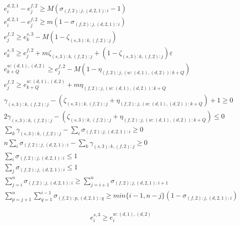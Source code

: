 \documentclass[]{interact}
\theoremstyle{plain}%
\theoremstyle{definition}
\theoremstyle{remark}
\begin{document}
\begin{eqnarray}
e^{d,2,1}_i-e^{f,2}_j\ge M(\sigma_{(f,2):j,(d,2,1):i}-1)\label{MergeErg:11.1}\\
e^{d,2,1}_i-e^{f,2}_j\ge m(1 - \sigma_{(f,2):j,(d,2,1):i})\\
e^{f,2}_{j} \ge e^{s,3}_{k} - M(1-\zeta_{(s,3):k,(f,2):j})\\ 
e^{s,3}_{k} \ge e^{f,2}_{j} + m\zeta_{(s,3):k,(f,2):j} +(1-\zeta_{(s,3):k,(f,2):j})\varepsilon\\ 
e^{w:(d,1),(d,2)}_{k+Q} \ge e^{f,2}_{j} - M(1-\eta_{(f,2):j,(w:(d,1),(d,2)):k+Q})\\
e^{f,2}_{j} \ge e^{w:(d,1),(d,2)}_{k+Q} + m\eta_{(f,2):j,(w:(d,1),(d,2)):k+Q}\\
\gamma_{(s,3):k,(f,2):j} - (\zeta_{(s,3):k,(f,2):j} + \eta_{(f,2):j,(w:(d,1),(d,2)):k+Q})+1\ge 0\\
2\gamma_{(s,3):k,(f,2):j}-(\zeta_{(s,3):k,(f,2):j} + \eta_{(f,2):j,(w:(d,1),(d,2)):k+Q})\le 0\\
\sum_k\gamma_{(s,3):k,(f,2):j}-\sum_i \sigma_{(f,2):j,(d,2,1):i} \ge 0\\
n\sum_{i}\sigma_{(f,2):j,(d,2,1):i} - \sum_k\gamma_{(s,3):k,(f,2):j}\ge 0\\
\sum_{i}\sigma_{(f,2):j,(d,2,1):i}\le 1\\
\sum_{j}\sigma_{(f,2):j,(d,2,1):i}\le 1\\
\sum_{j=i}^{n}\sigma_{(f,2):j,(d,2,1):i}\ge \sum_{j=i+1}^{n}\sigma_{(f,2):j,(d,2,1):i+1}\\
\sum_{p=j+1}^n\sum_{q=1}^{i-1} \sigma_{(f,2):p,(d,2,1):q} \ge min\{i-1,n-j\}(1-\sigma_{(f,2):j,(d,2,1):i})\label{MergeErg:11.2}
\end{eqnarray}

\begin{eqnarray}
e^{s,3}_i \ge e^{w:(d,1),(d,2)}_{i}\label{MergeErg:12}
\end{eqnarray}
\end{document}

